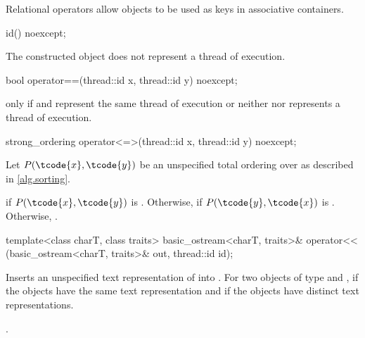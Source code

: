 \pnum
\begin{note}
Relational operators allow  objects to be used as
keys in associative containers.
\end{note}

%
\begin{itemdecl}
id() noexcept;
\end{itemdecl}

\begin{itemdescr}
\pnum
\ensures
The constructed object does not represent a thread of execution.
\end{itemdescr}

%
\begin{itemdecl}
bool operator==(thread::id x, thread::id y) noexcept;
\end{itemdecl}

\begin{itemdescr}
\pnum
\returns
{} only if  and  represent the same
thread of execution or neither  nor  represents a thread of
execution.
\end{itemdescr}

%
\begin{itemdecl}
strong_ordering operator<=>(thread::id x, thread::id y) noexcept;
\end{itemdecl}

\begin{itemdescr}
\pnum
Let $P(\tcode{x}, \tcode{y})$ be
an unspecified total ordering over 
as described in \ref{alg.sorting}.

\pnum
\returns
{} if $P(\tcode{x}, \tcode{y})$ is .
Otherwise, 
if $P(\tcode{y}, \tcode{x})$ is .
Otherwise, .
\end{itemdescr}

%
\begin{itemdecl}
template<class charT, class traits>
  basic_ostream<charT, traits>&
    operator<< (basic_ostream<charT, traits>& out, thread::id id);
\end{itemdecl}

\begin{itemdescr}
\pnum
\effects
Inserts an unspecified text representation of  into
. For two objects of type   and ,
if  the  objects have the same text
representation and if  the  objects have
distinct text representations.

\pnum
\returns
{}.
\end{itemdescr}

